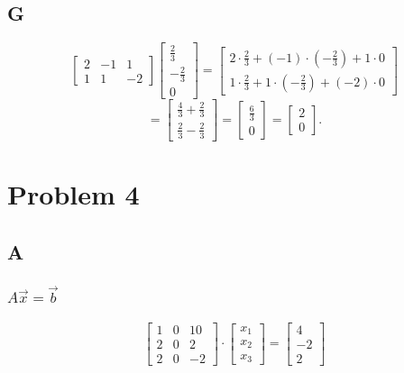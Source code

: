 \documentclass{article}
\begin{document}
\subsection*{G}

\[
	\begin{bmatrix}
		2 & -1 & 1  \\
		1 & 1  & -2
	\end{bmatrix}
	\begin{bmatrix}
		\frac{2}{3}  \\
		-\frac{2}{3} \\
		0
	\end{bmatrix}
	=
	\begin{bmatrix}
		2\cdot\frac{2}{3} + (-1)\cdot\left(-\frac{2}{3}\right) + 1\cdot 0 \\
		1\cdot\frac{2}{3} + 1\cdot\left(-\frac{2}{3}\right) + (-2)\cdot 0
	\end{bmatrix}
\]
\[
	=\begin{bmatrix}
		\frac{4}{3} + \frac{2}{3} \\
		\frac{2}{3} - \frac{2}{3}
	\end{bmatrix}
	=\begin{bmatrix}
		\frac{6}{3} \\
		0
	\end{bmatrix}
	=\begin{bmatrix}
		2 \\
		0
	\end{bmatrix}.
\]

\section*{Problem 4}

\subsection*{A}
\subsubsection*{$A\vec{x}=\vec{b}$}
\[
	\begin{bmatrix}
		1 & 0 & 10 \\
		2 & 0 & 2  \\
		2 & 0 & -2
	\end{bmatrix}
	\cdot
	\begin{bmatrix}
		x_1 \\
		x_2 \\
		x_3
	\end{bmatrix}
	=
	\begin{bmatrix}
		4 \\-2\\2
	\end{bmatrix}
\]
\end{document}
